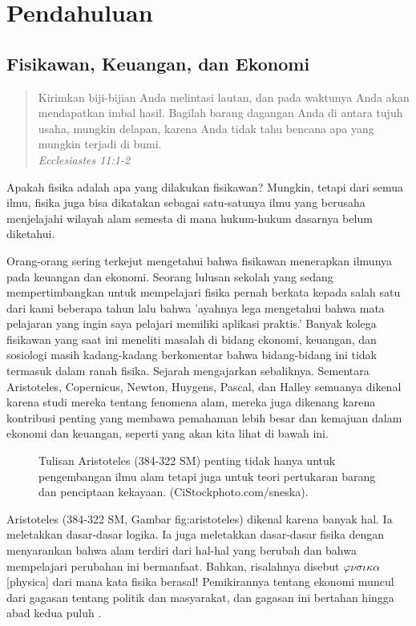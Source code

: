 \documentclass[a4paper,12pt]{book}
\begin{document}
\chapter{Pendahuluan}

\section{Fisikawan, Keuangan, dan Ekonomi}
\label{sec:1.1}

\begin{quote}
Kirimkan biji-bijian Anda melintasi lautan, dan pada waktunya Anda akan mendapatkan imbal hasil. Bagilah barang dagangan Anda di antara tujuh usaha, mungkin delapan, karena Anda tidak tahu bencana apa yang mungkin terjadi di bumi. \\
\textit{Ecclesiastes 11:1-2}
\end{quote}

Apakah fisika adalah apa yang dilakukan fisikawan? Mungkin, tetapi dari semua ilmu, fisika juga bisa dikatakan sebagai satu-satunya ilmu yang berusaha menjelajahi wilayah alam semesta di mana hukum-hukum dasarnya belum diketahui.

Orang-orang sering terkejut mengetahui bahwa fisikawan menerapkan ilmunya pada keuangan dan ekonomi. Seorang lulusan sekolah yang sedang mempertimbangkan untuk mempelajari fisika pernah berkata kepada salah satu dari kami beberapa tahun lalu bahwa 'ayahnya lega mengetahui bahwa mata pelajaran yang ingin saya pelajari memiliki aplikasi praktis.' Banyak kolega fisikawan yang saat ini meneliti masalah di bidang ekonomi, keuangan, dan sosiologi masih kadang-kadang berkomentar bahwa bidang-bidang ini tidak termasuk dalam ranah fisika. Sejarah mengajarkan sebaliknya. Sementara Aristoteles, Copernicus, Newton, Huygens, Pascal, dan Halley semuanya dikenal karena studi mereka tentang fenomena alam, mereka juga dikenang karena kontribusi penting yang membawa pemahaman lebih besar dan kemajuan dalam ekonomi dan keuangan, seperti yang akan kita lihat di bawah ini.

\begin{figure}[h]
\centering
\caption{Tulisan Aristoteles (384-322 SM) penting tidak hanya untuk pengembangan ilmu alam tetapi juga untuk teori pertukaran barang dan penciptaan kekayaan. (CiStockphoto.com/sneska).}
\label{fig:aristoteles}
\end{figure}

Aristoteles (384-322 SM, Gambar  {fig:aristoteles}) dikenal karena banyak hal. Ia meletakkan dasar-dasar logika. Ia juga meletakkan dasar-dasar fisika dengan menyarankan bahwa alam terdiri dari hal-hal yang berubah dan bahwa mempelajari perubahan ini bermanfaat. Bahkan, risalahnya disebut $\varphi \nu \sigma \iota \kappa \alpha$ [physica] dari mana kata fisika berasal! Pemikirannya tentang ekonomi muncul dari gagasan tentang politik dan masyarakat, dan gagasan ini bertahan hingga abad kedua puluh \cite{schumpeter1954}.
\end{document}
